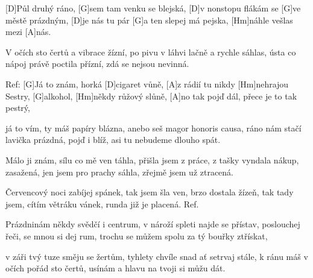 
[D]Půl druhý ráno, [G]sem tam venku se blejská,
[D]v nonstopu flákám se [G]ve městě prázdným,
[D]je nás tu pár [G]a ten slepej má pejska,
[Hm]náhle vešlas mezi [A]nás.

V očích sto čertů a vibrace žízní,
po pivu v láhvi lačně a rychle sáhlas,
ústa co nápoj právě poctila přízní,
zdá se nejsou nevinná.

Ref:
[G]Já to znám, horká [D]cigaret vůně,
[A]z rádií tu nikdy [Hm]nehrajou Sestry,
[G]alkohol, [Hm]někdy růžový slůně,
[A]no tak pojď dál, přece je to tak pestrý,

já to vím, ty máš papíry blázna,
anebo seš magor honoris causa,
ráno nám stačí lavička prázdná,
pojď i blíž, asi tu nebudeme dlouho spát.

Málo ji znám, sílu co mě ven táhla,
přišla jsem z práce, z tašky vyndala nákup,
zasažená, jen jsem pro prachy sáhla,
zřejmě jsem už ztracená.

Červencový noci zabíjej spánek,
tak jsem šla ven, brzo dostala žízeň,
tak tady jsem, cítím větráku vánek,
runda již je placená.
\columnbreak
Ref.

Prázdninám někdy svědčí i centrum,
v nároží spleti najde se přístav,
poslouchej řeči, se mnou si dej rum,
trochu se můžem spolu za tý bouřky ztřískat,

v záři tvý tuze směju se žertům,
tyhlety chvíle snad ať setrvaj stále,
k ránu máš v očích pořád sto čertů,
usínám a hlavu na tvoji si můžu dát.